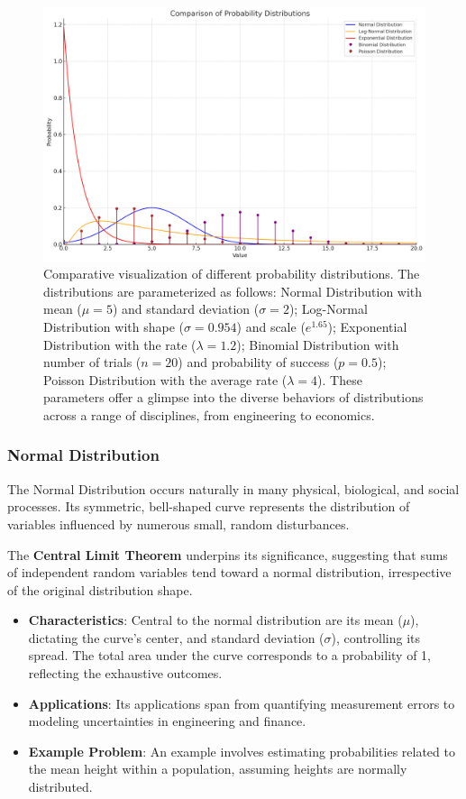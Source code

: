 \begin{figure}[ht]
\centering
\includegraphics[width=0.8\linewidth]{figures/dis.png}
\caption{Comparative visualization of different probability distributions. The distributions are parameterized as follows: Normal Distribution with mean (\( \mu = 5 \)) and standard deviation (\( \sigma = 2 \)); Log-Normal Distribution with shape (\( \sigma = 0.954 \)) and scale (\( e^{1.65} \)); Exponential Distribution with the rate (\( \lambda = 1.2 \)); Binomial Distribution with number of trials (\( n = 20 \)) and probability of success (\( p = 0.5 \)); Poisson Distribution with the average rate (\( \lambda = 4 \)). These parameters offer a glimpse into the diverse behaviors of distributions across a range of disciplines, from engineering to economics.}
\label{fig:distributions}
\end{figure}



\subsubsection*{Normal Distribution}

The Normal Distribution occurs naturally in many physical, biological, and social processes. Its symmetric, bell-shaped curve represents the distribution of variables influenced by numerous small, random disturbances. 
\begin{mdframed}

The \textbf{Central Limit Theorem} underpins its significance, suggesting that sums of independent random variables tend toward a normal distribution, irrespective of the original distribution shape.
\end{mdframed}

\begin{itemize}
    \item \textbf{Characteristics}: Central to the normal distribution are its mean (\( \mu \)), dictating the curve's center, and standard deviation (\( \sigma \)), controlling its spread. The total area under the curve corresponds to a probability of 1, reflecting the exhaustive outcomes.
    \item \textbf{Applications}: Its applications span from quantifying measurement errors to modeling uncertainties in engineering and finance. 
    \item \textbf{Example Problem}: An example involves estimating probabilities related to the mean height within a population, assuming heights are normally distributed.
\end{itemize}


